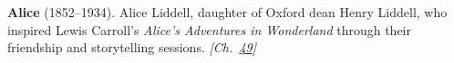 \textbf{Alice} (1852–1934). Alice Liddell, daughter of Oxford dean Henry Liddell, who inspired Lewis Carroll's \emph{Alice's Adventures in Wonderland} through their friendship and storytelling sessions. \emph{[Ch.~\hyperref[ch:ivfmtdna]{49}]}

